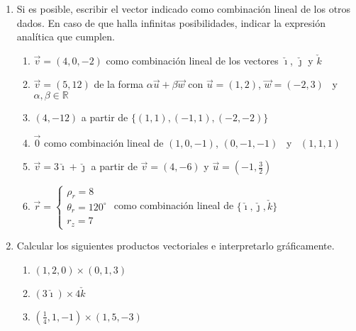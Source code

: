 \documentclass[a4paper]{article}
\newcommand{\exercise}{\item}
\newcommand{\SEL}[1]{ \left\{\begin{matrix} #1 \end{matrix}\right. }
\newcommand{\df}[2]{\displaystyle\frac{#1}{#2}}
\newcommand{\degs}{^{\circ}}
\begin{document}
\begin{enumerate}
\begin{multicols}{2}
\begin{enumerate} [label=(\alph*)]
		\item $(1,-5)$ y $\check{\imath}$
		\item $(3,-4,1)$ y $\check{k}$
		\item $5\check{\imath}$ y $-2\check{k}$
		\item $(1,-7,3)$ y $(2,4,0)$
		\item $\vec{v}=\SEL{|\vec{v}| = 10 \\ \theta_v = 135\degs }$ ~~y~~ $\vec{u}=\SEL{|\vec{u}| = 4 \\ \theta_u = -45\degs }$ 
		\item $(1,4)$ y $\vec{p}=\SEL{|\vec{p}| = 6 \\ \theta_p = 270\degs }$
	\end{enumerate}
	\end{multicols}
	\exercise Si es posible, escribir el vector indicado como combinación lineal de los otros dados. En caso de que halla infinitas posibilidades, indicar la expresión analítica que cumplen.
	\begin{enumerate} [label=(\alph*)]
		\item $\vec{v}=(4,0,-2)$ como combinación lineal de los vectores $\check{\imath}$, $\check{\jmath}$ y $\check{k}$
		\item $\vec{v} = (5,12)$ de la forma $\alpha \vec{u}+ \beta \vec{w}$ con $\vec{u}=(1,2)$, $\vec{w}=(-2,3)$ ~y~ $\alpha,\beta \in \mathbb{R}$
		\item $(4,-12)$ a partir de $\{(1,1),(-1,1),(-2,-2)\}$
		\item $\vec{0}$ como combinación lineal de $(1,0,-1)$, $(0,-1,-1)$ ~y~ $(1,1,1)$
		\item $\vec{v}=3\check{\imath}+\check{\jmath}$ a partir de $\vec{v}=(4,-6)$ y $\vec{u}=\left(-1,\df{3}{2}\right)$
		\item $\vec{r}=\SEL{ \rho_r = 8 \\ \theta_r = 120\degs\\ r_z = 7 }$ como combinación lineal de $\{\check{\imath}, \check{\jmath}, \check{k}\}$
	\end{enumerate}
	\exercise Calcular los siguientes productos vectoriales e interpretarlo gráficamente.
	\begin{multicols}{2}
	\begin{enumerate} [label=(\alph*)]
		\item $(1,2,0) \times (0,1,3)$
		\item $(3\check{\imath}) \times 4\check{k}$
		\item $\left(\df{1}{4},1,-1\right) \times \left(1,5,-3\right)$

\end{enumerate}
\end{multicols}
\end{enumerate}
\end{document}
